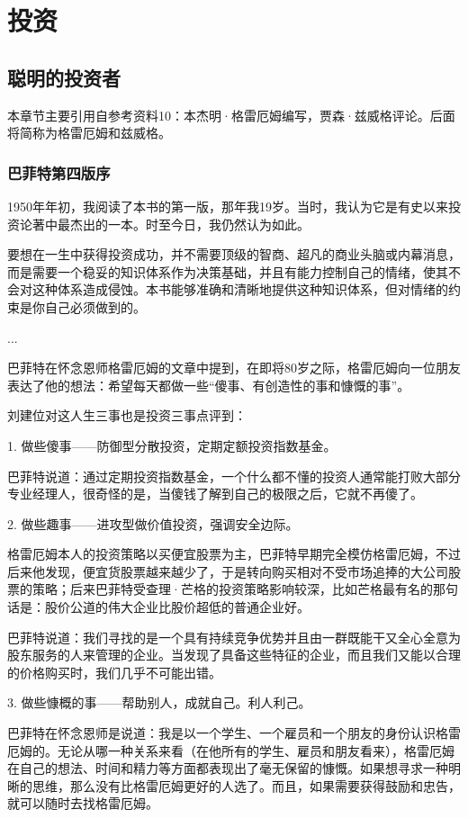 \documentclass[12pt,oneside]{book}
\begin{document}
\part{投资}

\chapter{聪明的投资者}
本章节主要引用自参考资料10：本杰明·格雷厄姆编写，贾森·兹威格评论。后面将简称为格雷厄姆和兹威格。

\section{巴菲特第四版序}
1950年年初，我阅读了本书的第一版，那年我19岁。当时，我认为它是有史以来投资论著中最杰出的一本。时至今日，我仍然认为如此。

要想在一生中获得投资成功，并不需要顶级的智商、超凡的商业头脑或内幕消息，而是需要一个稳妥的知识体系作为决策基础，并且有能力控制自己的情绪，使其不会对这种体系造成侵蚀。本书能够准确和清晰地提供这种知识体系，但对情绪的约束是你自己必须做到的。

...

巴菲特在怀念恩师格雷厄姆的文章中提到，在即将80岁之际，格雷厄姆向一位朋友表达了他的想法：希望每天都做一些“傻事、有创造性的事和慷慨的事”。

刘建位对这人生三事也是投资三事点评到：

1. 做些傻事——防御型分散投资，定期定额投资指数基金。

巴菲特说道：通过定期投资指数基金，一个什么都不懂的投资人通常能打败大部分专业经理人，很奇怪的是，当傻钱了解到自己的极限之后，它就不再傻了。

2. 做些趣事——进攻型做价值投资，强调安全边际。

格雷厄姆本人的投资策略以买便宜股票为主，巴菲特早期完全模仿格雷厄姆，不过后来他发现，便宜货股票越来越少了，于是转向购买相对不受市场追捧的大公司股票的策略；后来巴菲特受查理·芒格的投资策略影响较深，比如芒格最有名的那句话是：股价公道的伟大企业比股价超低的普通企业好。

巴菲特说道：我们寻找的是一个具有持续竞争优势并且由一群既能干又全心全意为股东服务的人来管理的企业。当发现了具备这些特征的企业，而且我们又能以合理的价格购买时，我们几乎不可能出错。


3. 做些慷概的事——帮助别人，成就自己。利人利己。

巴菲特在怀念恩师是说道：我是以一个学生、一个雇员和一个朋友的身份认识格雷厄姆的。无论从哪一种关系来看（在他所有的学生、雇员和朋友看来），格雷厄姆在自己的想法、时间和精力等方面都表现出了毫无保留的慷慨。如果想寻求一种明晰的思维，那么没有比格雷厄姆更好的人选了。而且，如果需要获得鼓励和忠告，就可以随时去找格雷厄姆。
\end{document}
